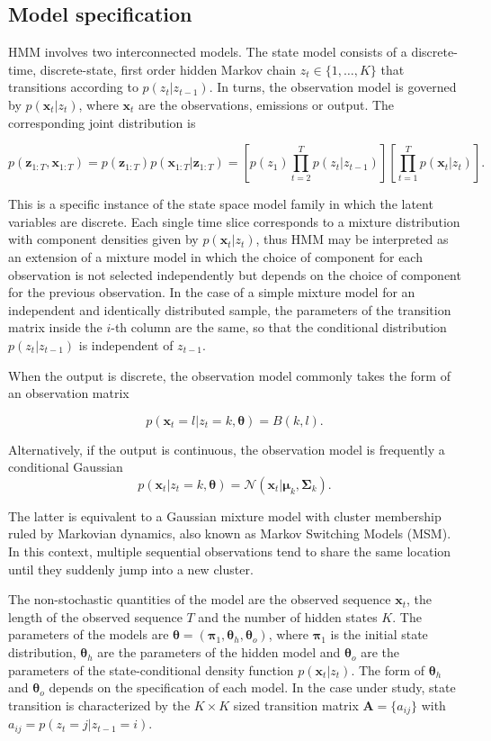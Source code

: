 \documentclass[]{article}
\newcommand{\mat}[1]{\mathbf{#1}}
\begin{document}
\subsection{Model specification}\label{model-specification}

HMM involves two interconnected models. The state model consists of a
discrete-time, discrete-state, first order hidden Markov chain
\(z_t \in \{1, \dots, K\}\) that transitions according to
\(p(z_t | z_{t-1})\). In turns, the observation model is governed by
\(p(\mat{x}_t | z_t)\), where \(\mat{x}_t\) are the observations,
emissions or output. The corresponding joint distribution is

\[
p(\mat{z}_{1:T}, \mat{x}_{1:T})
  = p(\mat{z}_{1:T}) p(\mat{x}_{1:T} | \mat{z}_{1:T})
  = \left[ p(z_1) \prod_{t=2}^{T}{p(z_t | z_{t-1})} \right] \left[ \prod_{t=1}^{T}{p(\mat{x}_t | z_{t})} \right].
\]

This is a specific instance of the state space model family in which the
latent variables are discrete. Each single time slice corresponds to a
mixture distribution with component densities given by
\(p(\mat{x}_t | z_t)\), thus HMM may be interpreted as an extension of a
mixture model in which the choice of component for each observation is
not selected independently but depends on the choice of component for
the previous observation. In the case of a simple mixture model for an
independent and identically distributed sample, the parameters of the
transition matrix inside the \(i\)-th column are the same, so that the
conditional distribution \(p(z_t | z_{t-1})\) is independent of
\(z_{t-1}\).

When the output is discrete, the observation model commonly takes the
form of an observation matrix

\[
p(\mat{x}_t = l | z_t = k, \mat{\theta}) = B(k, l).
\]

Alternatively, if the output is continuous, the observation model is
frequently a conditional Gaussian \[
p(\mat{x}_t | z_t = k, \mat{\theta}) = \mathcal{N}(\mat{x}_t | \mat{\mu}_k, \mat{\Sigma}_k).
\]

The latter is equivalent to a Gaussian mixture model with cluster
membership ruled by Markovian dynamics, also known as Markov Switching
Models (MSM). In this context, multiple sequential observations tend to
share the same location until they suddenly jump into a new cluster.

The non-stochastic quantities of the model are the observed sequence
\(\mat{x}_t\), the length of the observed sequence \(T\) and the number
of hidden states \(K\). The parameters of the models are
\(\mat{\theta} = (\mat{\pi}_1, \mat{\theta}_h, \mat{\theta}_o)\), where
\(\mat{\pi}_1\) is the initial state distribution, \(\mat{\theta}_h\)
are the parameters of the hidden model and \(\mat{\theta}_o\) are the
parameters of the state-conditional density function
\(p(\mat{x}_t | z_t)\). The form of \(\mat{\theta}_h\) and
\(\mat{\theta}_o\) depends on the specification of each model. In the
case under study, state transition is characterized by the
\(K \times K\) sized transition matrix \(\mat{A} = \{a_{ij}\}\) with
\(a_{ij} = p(z_t = j | z_{t-1} = i)\).
\end{document}
